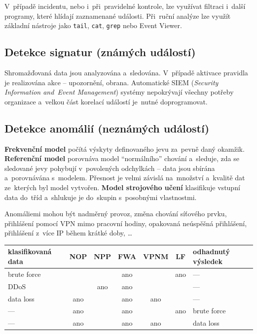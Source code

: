 V~případě incidentu, nebo i~při~pravidelné kontrole, lze využívat filtraci i~další programy, které hlídají zaznamenané události. Při~ruční analýze lze využít základní nástroje jako \texttt{tail}, \texttt{cat}, \texttt{grep} nebo Event Viewer.

\subsection{Detekce signatur (známých událostí)}

Shromažďovaná data jsou analyzována a~sledována. V~případě aktivace pravidla je realizována akce -- upozornění, obrana. Automatické SIEM (\emph{Security Information and~Event Management}) systémy nepokrývají všechny potřeby organizace a~velkou část korelací událostí je~nutné doprogramovat.

\subsection{Detekce anomálií (neznámých událostí)}

\textbf{Frekvenční model} počítá výskyty definovaného jevu za~pevně daný okamžik. \textbf{Referenční model} porovnáva model \enquote{normálního} chování a~sleduje, zda se sledované jevy pohybují v~povolených odchylkách -- data jsou sbírána a~porovnávána s~modelem. Přesnost je velmi závislá na~množství a~kvalitě dat ze~kterých byl model vytvořen. \textbf{Model strojového učení} klasifikuje vstupní data do~tříd a~shlukuje je do~skupin s~posobnými vlastnostmi.

Anomáliemi mohou být nadměrný provoz, změna chování síťového prvku, přihlášení pomocí VPN mimo pracovní hodiny, opakovaná neúspěšná přihlášení, přihlášení z~více IP během krátké doby, \dots

\begin{table}[ht]
\centering
\begin{tabular}{l|ccccc|l}
\textbf{klasifikovaná data} & NOP & NPP & FWA & VPNM & LF  & \textbf{odhadnutý výsledek} \\
\hline
brute force                 &     &     & ano &      & ano & --- \\
DDoS                        &     & ano & ano &      &     & --- \\
data loss                   & ano &     & ano & ano  &     & --- \\
\hline
--- & ano & & ano & & ano & brute force \\
--- & ano & & ano & ano & & data loss \\
\end{tabular}
\end{table}


